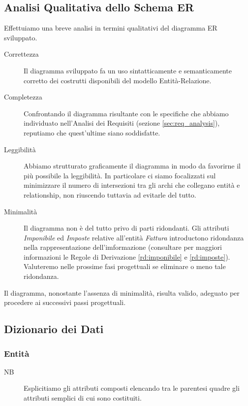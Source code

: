 		\newpage

	\subsection{Analisi Qualitativa dello Schema ER}
		
		Effettuiamo una breve analisi in termini qualitativi del diagramma ER sviluppato.
		
		\begin{description}
			\item[Correttezza] Il diagramma sviluppato fa un uso sintatticamente e semanticamente corretto dei costrutti disponibili del modello Entità-Relazione.
			\item[Completezza] Confrontando il diagramma risultante con le specifiche che abbiamo individuato nell'Analisi dei Requisiti (sezione \ref{sec:req_analysis}), reputiamo che quest'ultime siano soddisfatte.
			\item[Leggibilità] Abbiamo strutturato graficamente il diagramma in modo da favorirne il più possibile la leggibilità. In particolare ci siamo focalizzati sul minimizzare il numero di intersezioni tra gli archi che collegano entità e relationship, non riuscendo tuttavia ad evitarle del tutto.
			\item[Minimalità] Il diagramma non è del tutto privo di parti ridondanti. Gli attributi \emph{Imponibile} ed \emph{Imposte} relative all'entità \emph{Fattura} introductono ridondanza nella rappresentazione dell'imformazione (consultare per maggiori informazioni le Regole di Derivazione \ref{rd:imponibile} e \ref{rd:imposte}). Valuteremo nelle prossime fasi progettuali se eliminare o meno tale ridondanza.
		\end{description}
		
		Il diagramma, nonostante l'assenza di minimalità, risulta valido, adeguato per procedere ai successivi passi progettuali.
	
	\subsection{Dizionario dei Dati}
	\label{sec:data_dict}
		
		\subsubsection{Entità}
		\label{sec:entities}
			
			\begin{description}
				\item[NB] Esplicitiamo gli attributi composti elencando tra le parentesi quadre gli attributi semplici di cui sono costituiti.
			\end{description}
	
